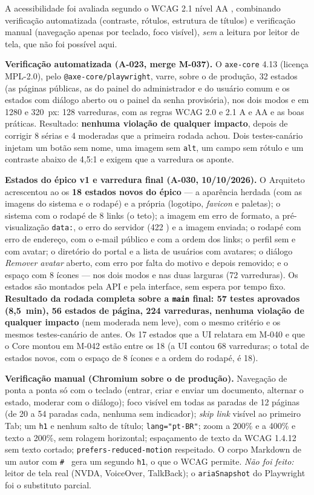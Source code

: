 A acessibilidade foi avaliada segundo o WCAG 2.1 nível AA \cite{wcag21}, combinando verificação automatizada (contraste, rótulos, estrutura de títulos) e verificação manual (navegação apenas por teclado, foco visível), \emph{sem} a leitura por leitor de tela, que não foi possível aqui.

\textbf{Verificação automatizada (A-023, merge M-037).} O \texttt{axe-core} \cite{axecore} 4.13 (licença MPL-2.0), pelo \texttt{@axe-core/playwright}, varre, sobre o  de produção, 32 estados (as páginas públicas, as do painel do administrador e do usuário comum e os estados com diálogo aberto ou o painel da senha provisória), nos dois modos e em 1280 e 320~px: 128 varreduras, com as regras WCAG 2.0 e 2.1 A e AA e as boas práticas. Resultado: \textbf{nenhuma violação de qualquer impacto}, depois de corrigir 8 sérias e 4 moderadas que a primeira rodada achou. Dois testes-canário injetam um botão sem nome, uma imagem sem \texttt{alt}, um campo sem rótulo e um contraste abaixo de 4,5:1 e exigem que a varredura os aponte.

\textbf{Estados do épico v1 e varredura final (A-030, 10/10/2026).} O Arquiteto acrescentou ao  os \textbf{18 estados novos do épico} --- a aparência herdada (com as imagens do sistema e o rodapé) e a própria (logotipo, \emph{favicon} e paletas); o sistema com o rodapé de 8 links (o teto); a imagem em erro de formato, a pré-visualização \texttt{data:}, o erro do servidor (422 ) e a imagem enviada; o rodapé com erro de endereço, com o e-mail público e com a ordem dos links; o perfil sem e com avatar; o diretório do portal e a lista de usuários com avatares; o diálogo \emph{Remover avatar} aberto, com erro por falta do motivo e depois removido; e o espaço com 8 ícones --- nos dois modos e nas duas larguras (72 varreduras). Os estados são montados pela API e pela interface, sem espera por tempo fixo. \textbf{Resultado da rodada completa sobre a \texttt{main} final: 57 testes aprovados (8,5~min), 56 estados de página, 224 varreduras, nenhuma violação de qualquer impacto} (nem moderada nem leve), com o mesmo critério e os mesmos testes-canário de antes. Os 17 estados que a UI relatara em M-040 e que o Core montou em M-042 estão entre os 18 (a UI contou 68 varreduras; o total de estados novos, com o espaço de 8 ícones e a ordem do rodapé, é 18).

\textbf{Verificação manual (Chromium sobre o  de produção).} Navegação de ponta a ponta só com o teclado (entrar, criar e enviar um documento, alternar o estado, moderar com o diálogo); foco visível em todas as paradas de 12 páginas (de 20 a 54 paradas cada, nenhuma sem indicador); \emph{skip link} visível ao primeiro Tab; um \texttt{h1} e nenhum salto de título; \texttt{lang="pt-BR"}; zoom a 200\% e a 400\% e texto a 200\%, sem rolagem horizontal; espaçamento de texto da WCAG 1.4.12 sem texto cortado; \texttt{prefers-reduced-motion} respeitado. O corpo Markdown de um autor com \texttt{\# } gera um segundo \texttt{h1}, o que o WCAG permite. \emph{Não foi feito:} leitor de tela real (NVDA, VoiceOver, TalkBack); o \texttt{ariaSnapshot} do Playwright foi o substituto parcial.

